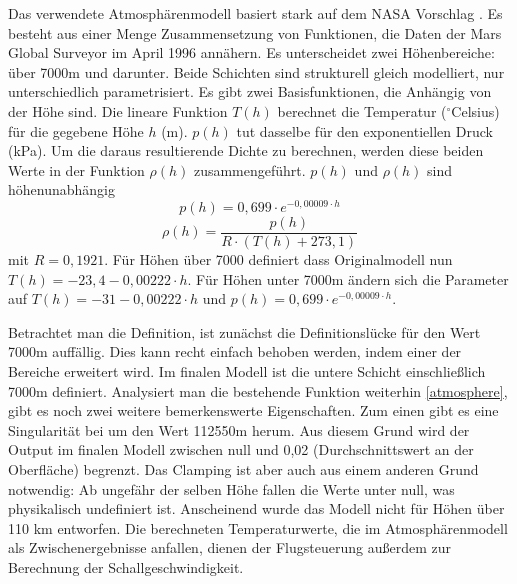 Das verwendete Atmosphärenmodell basiert stark auf dem NASA Vorschlag \cite{Hall2015}. Es besteht aus einer Menge Zusammensetzung von Funktionen, die Daten der Mars Global Surveyor im April 1996 annähern. Es unterscheidet zwei Höhenbereiche: über 7000m und darunter. Beide Schichten sind strukturell gleich modelliert, nur unterschiedlich parametrisiert. Es gibt zwei Basisfunktionen, die Anhängig von der Höhe sind. Die lineare Funktion $T(h)$ berechnet die Temperatur ($^{\circ}$Celsius) für die gegebene Höhe $h$ (m). $p(h)$ tut dasselbe für den exponentiellen Druck (kPa). Um die daraus resultierende Dichte zu berechnen, werden diese beiden Werte in der Funktion $\rho(h)$ zusammengeführt. $p(h)$ und $\rho(h)$ sind höhenunabhängig
$$ p(h) = 0,699 \cdot e^{-0,00009 \cdot h}$$
$$ \rho(h) =  \frac{p(h)}{R \cdot (T(h) + 273,1)} $$
mit $ R = 0,1921 $. Für Höhen über 7000 definiert dass Originalmodell nun $ T(h) = -23,4 - 0,00222 \cdot h $. Für Höhen unter 7000m ändern sich die Parameter auf $ T(h) = -31 - 0,00222 \cdot h $ und $ p(h) = 0,699 \cdot e^{-0,00009 \cdot h}$.

Betrachtet man die Definition, ist zunächst die Definitionslücke für den Wert 7000m auffällig. Dies kann recht einfach behoben werden, indem einer der Bereiche erweitert wird. Im finalen Modell ist die untere Schicht einschließlich 7000m definiert. Analysiert man die bestehende Funktion weiterhin \ref{atmosphere}, gibt es noch zwei weitere bemerkenswerte Eigenschaften.
Zum einen gibt es eine Singularität bei um den Wert 112550m herum. Aus diesem Grund wird der Output im finalen Modell zwischen null und 0,02 (Durchschnittswert an der Oberfläche)\cite{NASA2016} begrenzt. Das Clamping ist aber auch aus einem anderen Grund notwendig: Ab ungefähr der selben Höhe fallen die Werte unter null, was physikalisch undefiniert ist. Anscheinend wurde das Modell nicht für Höhen über 110 km entworfen. Die berechneten Temperaturwerte, die im Atmosphärenmodell als Zwischenergebnisse anfallen, dienen der Flugsteuerung außerdem zur Berechnung der Schallgeschwindigkeit.